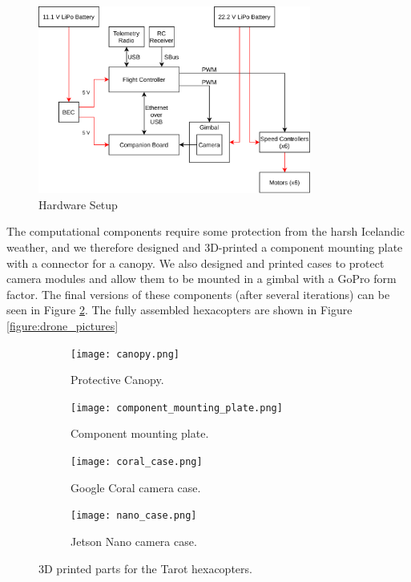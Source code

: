 \begin{figure}
    \centering
    \includegraphics[width=0.8\textwidth]{images/hardware.png}
    \caption{Hardware Setup}
    \label{fig:hardware_setup}
\end{figure}

The computational components require some protection from the harsh Icelandic weather,
and we therefore designed and 3D-printed a component mounting plate with a connector for a canopy.
We also designed and printed cases to protect camera modules and allow them to be mounted in a gimbal with a GoPro form factor.
The final versions of these components (after several iterations) can be seen in Figure \ref{figure:printed_parts}.
The fully assembled hexacopters are shown in Figure \ref{figure:drone_pictures}

\begin{figure}
  \centering
  \begin{subfigure}[b]{0.33\textwidth}
    \texttt{[image: canopy.png]}
    \caption*{Protective Canopy.}
  \end{subfigure}
  \hspace{1cm}
  \begin{subfigure}[b]{0.33\textwidth}
    \texttt{[image: component\_mounting\_plate.png]}
    \caption*{Component mounting plate.}
  \end{subfigure}

  \begin{subfigure}[b]{0.33\textwidth}
    \texttt{[image: coral\_case.png]}
    \caption*{Google Coral camera case.}
  \end{subfigure}
  \hspace{1cm}
  \begin{subfigure}[b]{0.33\textwidth}
    \texttt{[image: nano\_case.png]}
    \caption*{Jetson Nano camera case.}
  \end{subfigure}
  \caption{3D printed parts for the Tarot hexacopters.}
  \label{figure:printed_parts}
\end{figure}


